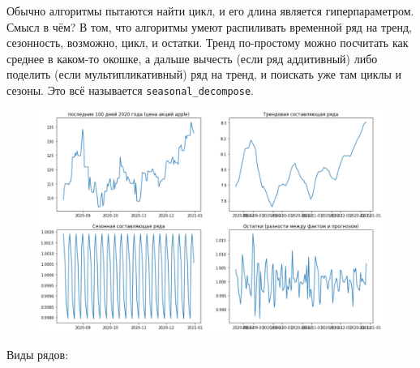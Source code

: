 \documentclass{article}
\begin{document}
    Обычно алгоритмы пытаются найти цикл, и его длина является гиперпараметром.\\
    Смысл в чём? В том, что алгоритмы умеют распиливать временной ряд на тренд, сезонность, возможно, цикл, и остатки. Тренд по-простому можно посчитать как среднее в каком-то окошке, а дальше вычесть (если ряд аддитивный) либо поделить (если мультипликативный) ряд на тренд, и поискать уже там циклы и сезоны. Это всё называется \Verb|seasonal_decompose|.
    \begin{figure}[H]
        \includegraphics[width=.7\linewidth]{"Images/Цена акций Apple за 2020"}
    \end{figure}\noindent
    Виды рядов:
\end{document}
